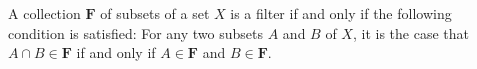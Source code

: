 \documentclass[12pt]{article}
\begin{document}
A collection $\mathbf{F}$ of subsets of a set $X$ is a filter if and only if the following condition is satisfied:  For any two subsets $A$ and $B$ of $X$, it is the case that $A \cap B \in \mathbf{F}$ if and only if $A \in \mathbf{F}$ and $B \in \mathbf{F}$.
\end{document}
